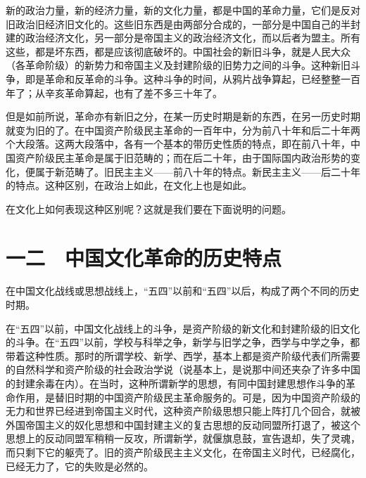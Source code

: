 新的政治力量，新的经济力量，新的文化力量，都是中国的革命力量，它们是反对旧政治旧经济旧文化的。这些旧东西是由两部分合成的，一部分是中国自己的半封建的政治经济文化，另一部分是帝国主义的政治经济文化，而以后者为盟主。所有这些，都是坏东西，都是应该彻底破坏的。中国社会的新旧斗争，就是人民大众（各革命阶级）的新势力和帝国主义及封建阶级的旧势力之间的斗争。这种新旧斗争，即是革命和反革命的斗争。这种斗争的时间，从鸦片战争算起，已经整整一百年了；从辛亥革命算起，也有了差不多三十年了。

但是如前所说，革命亦有新旧之分，在某一历史时期是新的东西，在另一历史时期就变为旧的了。在中国资产阶级民主革命的一百年中，分为前八十年和后二十年两个大段落。这两大段落中，各有一个基本的带历史性质的特点，即在前八十年，中国资产阶级民主革命是属于旧范畴的；而在后二十年，由于国际国内政治形势的变化，便属于新范畴了。旧民主主义——前八十年的特点。新民主主义——后二十年的特点。这种区别，在政治上如此，在文化上也是如此。

在文化上如何表现这种区别呢？这就是我们要在下面说明的问题。

\section{一二　中国文化革命的历史特点}

在中国文化战线或思想战线上，“五四”以前和“五四”以后，构成了两个不同的历史时期。

在“五四”以前，中国文化战线上的斗争，是资产阶级的新文化和封建阶级的旧文化的斗争。在“五四”以前，学校与科举之争，新学与旧学之争，西学与中学之争，都带着这种性质。那时的所谓学校、新学、西学，基本上都是资产阶级代表们所需要的自然科学和资产阶级的社会政治学说（说基本上，是说那中间还夹杂了许多中国的封建余毒在内）。在当时，这种所谓新学的思想，有同中国封建思想作斗争的革命作用，是替旧时期的中国资产阶级民主革命服务的。可是，因为中国资产阶级的无力和世界已经进到帝国主义时代，这种资产阶级思想只能上阵打几个回合，就被外国帝国主义的奴化思想和中国封建主义的复古思想的反动同盟所打退了，被这个思想上的反动同盟军稍稍一反攻，所谓新学，就偃旗息鼓，宣告退却，失了灵魂，而只剩下它的躯壳了。旧的资产阶级民主主义文化，在帝国主义时代，已经腐化，已经无力了，它的失败是必然的。

